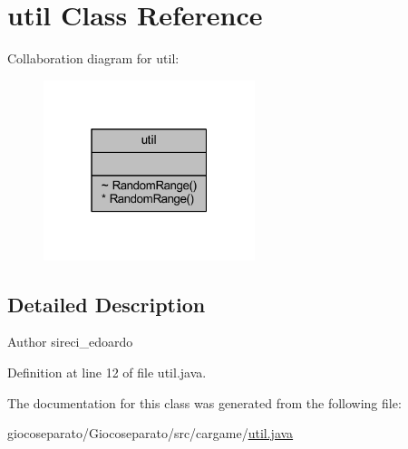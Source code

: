 \hypertarget{classcargame_1_1util}{}\section{util Class Reference}
\label{classcargame_1_1util}


Collaboration diagram for util\+:
\nopagebreak
\begin{figure}[H]
\begin{center}
\leavevmode
\includegraphics[width=175pt]{classcargame_1_1util__coll__graph}
\end{center}
\end{figure}


\subsection{Detailed Description}
\begin{DoxyAuthor}{Author}
sireci\+\_\+edoardo 
\end{DoxyAuthor}


Definition at line 12 of file util.\+java.



The documentation for this class was generated from the following file\+:\begin{DoxyCompactItemize}
\item 
giocoseparato/\+Giocoseparato/src/cargame/\hyperlink{util_8java}{util.\+java}\end{DoxyCompactItemize}
